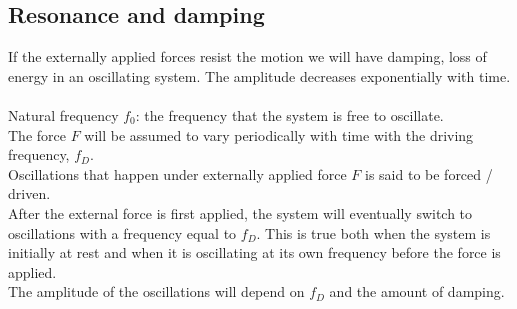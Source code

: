 \documentclass[a4paper,12pt]{article}
\begin{document}
\subsection{Resonance and damping}
If the externally applied forces resist the motion we will have damping, loss of energy in an oscillating system.
The amplitude decreases exponentially with time.\\\\
Natural frequency $f_0$: the frequency that the system is free to oscillate.\\
The force $F$ will be assumed to vary periodically with time with the driving frequency, $f_D$.\\
Oscillations that happen under externally applied force $F$ is said to be forced / driven.\\
After the external force is first applied, the system will eventually switch to oscillations with a
frequency equal to $f_D$. This is true both when the system is initially at rest and when it is
oscillating at its own frequency before the force is applied.\\
The amplitude of the oscillations will depend on $f_D$ and the amount of damping. 
\end{document}
